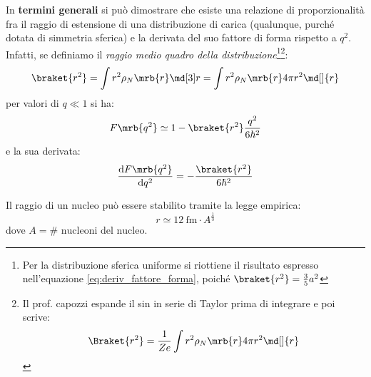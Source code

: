 \begin{itemize}
	      In \textbf{termini generali} si può dimostrare che esiste una
	      relazione di proporzionalità fra il raggio di estensione di una
	      distribuzione di carica (qualunque, purché dotata di simmetria sferica) e
	      la derivata del suo fattore di forma rispetto a $q^2$. Infatti, se
	      definiamo il \textit{raggio medio quadro della distribuzione}\footnote{
		      Per la distribuzione sferica uniforme si riottiene il risultato espresso
		      nell'equazione \ref{eq:deriv_fattore_forma}, poiché $\braket{r^2} =
			      \frac{3}{5}a^2$
	      }\footnote{
		      Il prof. capozzi espande il sin in serie di Taylor prima di integrare e
		      poi scrive:
		      \[
			      \Braket{r^2} = \frac{1}{Ze} \int r^2 \rho_N \mrb{r} 4 \pi r^2 \md[]{r}
		      \]
	      }:
	      \begin{equation}
		      \braket{r^2}
		      = \int r^2 \rho_N\mrb{r} \md[3]r
		      = \int r^2 \rho_N\mrb{r} 4 \pi r^2 \md[]{r}
	      \end{equation}
	      per valori di $q \ll 1$ si ha:
	      \begin{equation}
		      F\mrb{q^2} \simeq 1 - \braket{r^2} \frac{q^2}{6\hbar^2}
	      \end{equation}
	      e la sua derivata:
	      \begin{equation}
		      \frac{\mathrm{d}F\mrb{q^2}}{\mathrm{d}q^2} =
		      -\frac{\braket{r^2}}{6\hbar^2}
	      \end{equation}



	      \begin{note}
		      Il raggio di un nucleo può essere stabilito tramite la legge empirica:
		      \[
			      r \simeq \SI{12}{\femto\m} \cdot A^{\frac{1}{3}}
		      \]
		      dove $A = \# \text{ nucleoni del nucleo}$.
	      \end{note}


\end{itemize}
